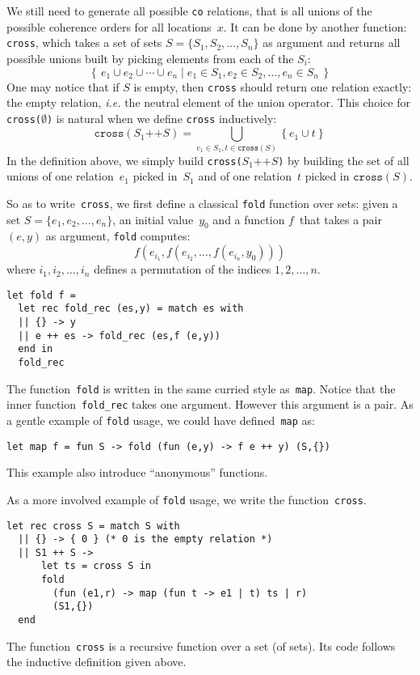 We still need to generate all possible \texttt{co} relations,
that is all unions of the possible coherence orders for
all locations~$x$.  It can be done by another \cat{} function:
\texttt{cross}, which takes a set of sets $S = \{S_1, S_2, \ldots, S_n\}$ as
argument and returns all possible unions built by picking elements from each of
the $S_i$:
$$
\left\{\, e_1 \cup e_2 \cup \cdots \cup e_n \mid
e_1 \in S_1, e_2 \in S_2, \ldots, e_n \in S_n \,\right\}
$$
One may notice that if $S$ is empty, then \texttt{cross} should
return one relation exactly: the empty relation, \emph{i.e.} the neutral
element of the union operator.
This choice for \texttt{cross($\emptyset$)} is natural
when we define \texttt{cross} inductively:
$$
\texttt{cross}(S_1 \mathop{\texttt{++}} S) =
\bigcup_{e_1 \in S_1, t \in \texttt{cross}(S)} \left\{ e_1 \cup t \right\}
$$
In the definition above, we simply build
\texttt{cross($S_1 \mathop{\texttt{++}} S$)} by building the set
of all unions of one relation~$e_1$ picked in~$S_1$
and of one relation~$t$ picked in $\texttt{cross}(S)$.

So as to write~\texttt{cross},
we first define a classical \texttt{fold} function over sets:
given a set $S = \{ e_1, e_2, \ldots, e_n\}$, an initial value~$y_0$
and a function $f$~that takes a pair $(e,y)$ as argument,
\texttt{fold} computes:
$$
f (e_{i_1},f (e_{i_2}, \ldots, f(e_{i_n},y_0)))
$$
where $i_1, i_2, \ldots, i_n$ defines a permutation
of the indices $1, 2, \ldots, n$.
\begin{verbatim}
let fold f =
  let rec fold_rec (es,y) = match es with
  || {} -> y
  || e ++ es -> fold_rec (es,f (e,y))
  end in
  fold_rec
\end{verbatim}
The function~\texttt{fold} is written in the same curried style as~\texttt{map}.
Notice that the inner function~\verb+fold_rec+ takes one argument.
However this argument is a pair.
As a gentle example of \texttt{fold} usage, we could have
defined~\texttt{map} as:
\begin{verbatim}
let map f = fun S -> fold (fun (e,y) -> f e ++ y) (S,{})
\end{verbatim}
This example also introduce ``anonymous'' functions.


As a more involved example of \texttt{fold} usage, we
 write the function~\texttt{cross}.
\begin{verbatim}
let rec cross S = match S with
  || {} -> { 0 } (* 0 is the empty relation *)
  || S1 ++ S ->
      let ts = cross S in
      fold
        (fun (e1,r) -> map (fun t -> e1 | t) ts | r)
        (S1,{})
  end
\end{verbatim}
The function~\texttt{cross} is a recursive function over a set (of sets).
Its code follows the inductive definition given above.

